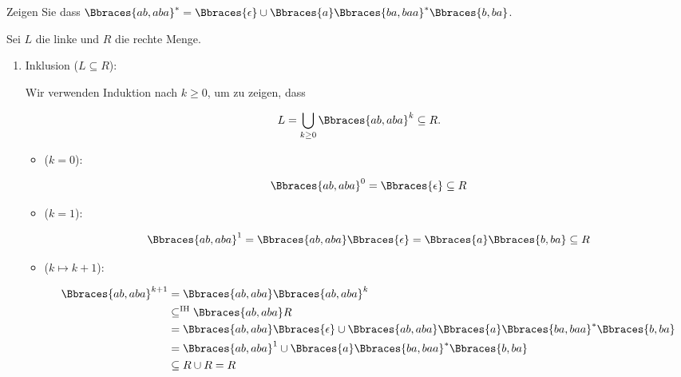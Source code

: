 
\begin{exercise}

Zeigen Sie dass $\Bbraces{ab, aba}^\ast = \Bbraces{\epsilon} \cup \Bbraces{a} \Bbraces{ba, baa}^\ast \Bbraces{b, ba}$.

\end{exercise}


\begin{solution}

Sei $L$ die linke und $R$ die rechte Menge.

\begin{enumerate}[label = \arabic*.]

    \item Inklusion ($L \subseteq R$):
    
    Wir verwenden Induktion nach $k \geq 0$, um zu zeigen, dass

    \begin{align*}
        L = \bigcup_{k \geq 0} \Bbraces{ab, aba}^k \subseteq R.
    \end{align*}

    \begin{itemize}

        \item ($k = 0$):
        
        \begin{align*}
            \Bbraces{ab, aba}^0
            =
            \Bbraces{\epsilon}
            \subseteq
            R
        \end{align*}

        \item ($k = 1$):
        
        \begin{align*}
            \Bbraces{ab, aba}^1
            =
            \Bbraces{ab, aba} \Bbraces{\epsilon}
            =
            \Bbraces{a} \Bbraces{b, ba}
            \subseteq
            R
        \end{align*}

        \item ($k \mapsto k + 1$):
        
        \begin{align*}
            \Bbraces{ab, aba}^{k+1}
            & =
            \Bbraces{ab, aba} \Bbraces{ab, aba}^k \\
            & \subseteq^\text{IH}
            \Bbraces{ab, aba} R \\
            & =
            \Bbraces{ab, aba} \Bbraces{\epsilon} \cup \Bbraces{ab, aba} \Bbraces{a} \Bbraces{ba, baa}^\ast \Bbraces{b, ba} \\
            & =
            \Bbraces{ab, aba}^1 \cup \Bbraces{a} \Bbraces{ba, baa}^\ast \Bbraces{b, ba} \\
            & \subseteq
            R \cup R
            =
            R
        \end{align*}


\end{itemize}
\end{enumerate}
\end{solution}
